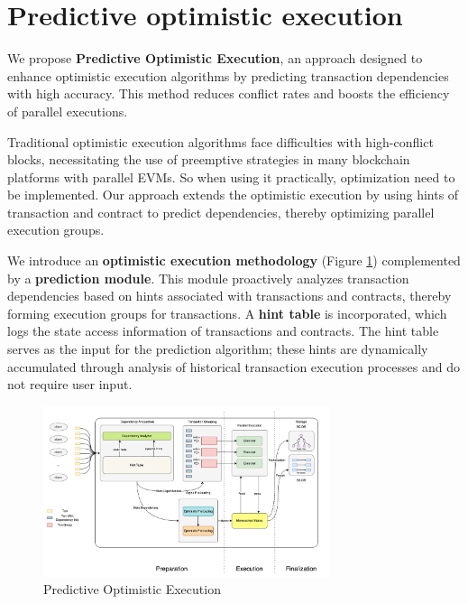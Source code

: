 
\section{Predictive optimistic execution}

We propose \textbf{Predictive Optimistic Execution}, an approach designed to enhance optimistic execution algorithms by predicting transaction dependencies with high accuracy. This method reduces conflict rates and boosts the efficiency of parallel executions.

Traditional optimistic execution algorithms face difficulties with high-conflict blocks, necessitating the use of preemptive strategies in many blockchain platforms with parallel EVMs. So when using it practically, optimization need to be implemented. Our approach extends the optimistic execution by using hints of transaction and contract to predict dependencies, thereby optimizing parallel execution groups.

We introduce an \textbf{optimistic execution methodology} (Figure \ref{fig:predictive_optimistic_execution}) complemented by a \textbf{prediction module}. This module proactively analyzes transaction dependencies based on hints associated with transactions and contracts, thereby forming execution groups for transactions. A \textbf{hint table} is incorporated, which logs the state access information of transactions and contracts. The hint table serves as the input for the prediction algorithm; these hints are dynamically accumulated through analysis of historical transaction execution processes and do not require user input.

\begin{figure}[htp]
\centering
\includegraphics[width=0.75\textwidth]{sections/images/predictive-optimistic-execution.png}
\caption{Predictive Optimistic Execution}
\label{fig:predictive_optimistic_execution}
\end{figure}

